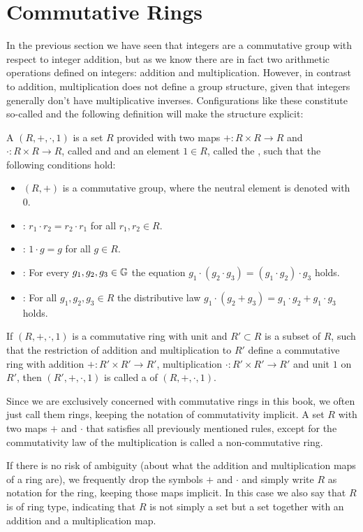 \section{Commutative Rings}\label{sec:rings}
In the previous section we have seen that integers are a commutative group with respect to integer addition, but as we know there are in fact two arithmetic operations defined on integers: addition and multiplication. However, in contrast to addition, multiplication does not define a group structure, given that integers generally don't have multiplicative inverses. Configurations like these constitute so-called  and the following definition will make the structure explicit: 

\begin{definition}\label{def:comm-ring-unit}
A  $ (R, +, \cdot, 1) $ is a set $R$ provided with two maps $ +: R \times R \to R $ and $ \cdot: R \times R \to R $, called  and  and an element $1\in R$, called the , such that the following conditions hold:
\begin{itemize}
\item $ (R, +) $ is a commutative group, where the neutral element is denoted  with $ 0 $.
\item {}: $r_1\cdot r_2 = r_2\cdot r_1$ for all $r_1, r_2\in R$.
\item {}: $1\cdot g=g$ for all $g\in R$.
\item {}: For every $g_1,g_2,g_3\in\mathbb{G}$ the equation
$g_1\cdot(g_2\cdot g_3) = (g_1\cdot g_2)\cdot g_3$ holds.
\item {}: For all $ g_1, g_2, g_3 \in R $ the distributive law
$ g_1 \cdot \left (g_2 + g_3 \right) = g_1 \cdot g_2 + g_1 \cdot g_3$ holds.
\end{itemize}
If $(R,+,\cdot,1)$ is a commutative ring with unit and $R'\subset R$ is a subset of $R$, such that the restriction of addition and multiplication to $R'$ define a commutative ring with addition $+: R'\times R' \to R'$, multiplication $\cdot: R'\times R' \to R'$ and unit $1$ on $R'$, then $(R',+,\cdot,1)$ is called a  of $(R,+,\cdot,1)$.
\end{definition}
\begin{notation}Since we are exclusively concerned with commutative rings in this book, we often just call them rings, keeping the notation of commutativity implicit.
A set $R$ with two maps $+$ and $\cdot$ that satisfies all previously mentioned rules, except for the commutativity law of the multiplication is called a non-commutative ring. 

If there is no risk of ambiguity (about what the addition and multiplication maps  of a ring are), we frequently drop the symbols $+$ and $\cdot$ and simply write $R$ as notation for the ring, keeping those maps implicit. In this case we also say that $R$ is of ring type, indicating that $R$ is not simply a set but a set together with an addition and a multiplication map.
\end{notation}
